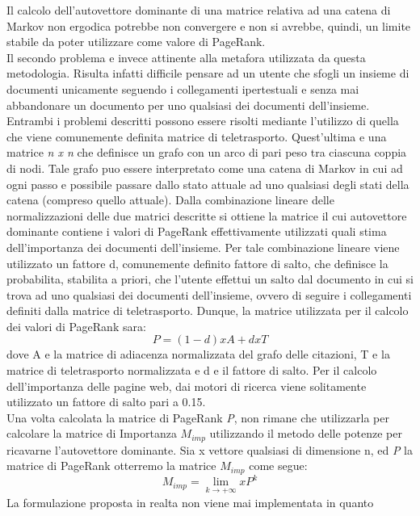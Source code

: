 Il calcolo dell'autovettore dominante di una matrice relativa ad una catena di
Markov non ergodica potrebbe non convergere e non si avrebbe, quindi, un
limite stabile da poter utilizzare come valore di PageRank.\\
Il secondo problema e invece attinente alla metafora utilizzata da questa
metodologia. Risulta infatti difficile pensare ad un utente che sfogli un insieme
di documenti unicamente seguendo i collegamenti ipertestuali e senza
mai abbandonare un documento per uno qualsiasi dei documenti dell'insieme.
Entrambi i problemi descritti possono essere risolti mediante l'utilizzo di
quella che viene comunemente definita matrice di teletrasporto. Quest'ultima
e una matrice \textit{n x n} che definisce un grafo con un arco di pari peso tra ciascuna
coppia di nodi. Tale grafo puo essere interpretato come una catena di Markov
in cui ad ogni passo e possibile passare dallo stato attuale ad uno qualsiasi
degli stati della catena (compreso quello attuale). Dalla combinazione lineare
delle normalizzazioni delle due matrici descritte si ottiene la matrice il cui
autovettore dominante contiene i valori di PageRank effettivamente utilizzati
quali stima dell'importanza dei documenti dell'insieme. Per tale combinazione
lineare viene utilizzato un fattore d, comunemente definito fattore di salto,
che definisce la probabilita, stabilita a priori, che l'utente effettui un salto dal
documento in cui si trova ad uno qualsiasi dei documenti dell'insieme, ovvero
di seguire i collegamenti definiti dalla matrice di teletrasporto. Dunque, la
matrice utilizzata per il calcolo dei valori di PageRank sara:
\begin{equation}
P = (1 - d) x A + d x T
\end{equation}
dove A e la matrice di adiacenza normalizzata del grafo delle citazioni, T e
la matrice di teletrasporto normalizzata e d e il fattore di salto. Per il calcolo
dell'importanza delle pagine web, dai motori di ricerca viene solitamente
utilizzato un fattore di salto pari a 0.15.\\
Una volta calcolata la matrice di PageRank \textit{P}, non rimane che utilizzarla
per calcolare la matrice di Importanza $M_{imp}$ utilizzando il metodo delle potenze
per ricavarne l'autovettore dominante. Sia x vettore qualsiasi di dimensione n,
ed \textit{P} la matrice di PageRank otterremo la matrice $M_{imp}$ come segue:
\begin{equation}
M_{imp} = \lim_{k \rightarrow +\infty} x P^{k}
\end{equation}
La formulazione proposta in realta non viene mai implementata in quanto
